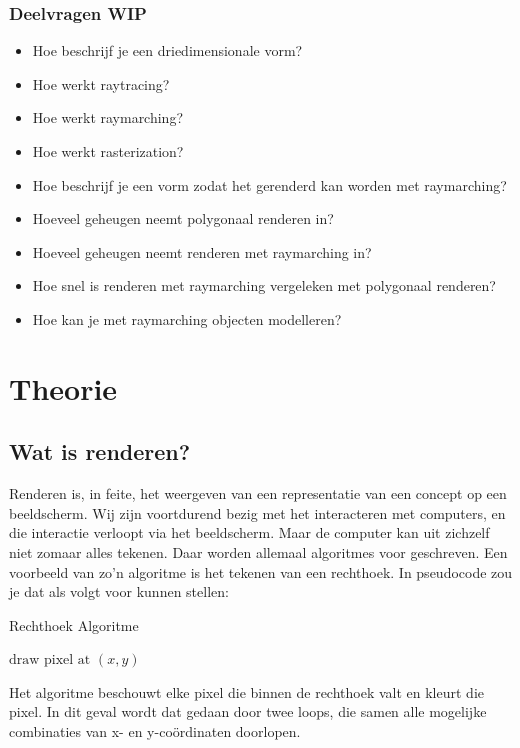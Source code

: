 \documentclass[12pt, a4paper]{article}
\begin{document}
\subsubsection{Deelvragen WIP}
\begin{itemize}
\item{Hoe beschrijf je een driedimensionale vorm?}
\item{Hoe werkt raytracing?}
\item{Hoe werkt raymarching?}
\item{Hoe werkt rasterization?}
\item{Hoe beschrijf je een vorm zodat het gerenderd kan worden met raymarching?}
\item{Hoeveel geheugen neemt polygonaal renderen in?}
\item{Hoeveel geheugen neemt renderen met raymarching in?}
\item{Hoe snel is renderen met raymarching vergeleken met polygonaal renderen?}
\item{Hoe kan je met raymarching objecten modelleren?}
\end{itemize}
\clearpage
\section{Theorie}
\subsection{Wat is renderen?}
Renderen is, in feite, het weergeven van een representatie van een concept op een beeldscherm. Wij zijn voortdurend bezig met het interacteren met computers, en die interactie verloopt via het beeldscherm. Maar de computer kan uit zichzelf niet zomaar alles tekenen. Daar worden allemaal algoritmes voor geschreven. Een voorbeeld van zo'n algoritme is het tekenen van een rechthoek. In pseudocode zou je dat als volgt voor kunnen stellen:
\begin{algorithm}
\caption{Rechthoek Algoritme}\label{euclid}
\begin{algorithmic}[1]
		\State $\text{draw pixel at }(x, y)$
	    \EndFor
    \EndFor
\EndProcedure
\end{algorithmic}
\end{algorithm}

Het algoritme beschouwt elke pixel die binnen de rechthoek valt en kleurt die pixel. In dit geval wordt dat gedaan door twee loops, die samen alle mogelijke combinaties van x- en y-coördinaten doorlopen. 
\end{document}
